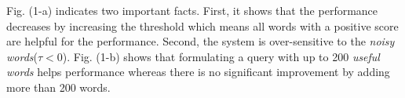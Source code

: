 \documentclass{sig-alternate}
\begin{document}
Fig. (1-a) indicates two important facts. First, it shows that the performance decreases by increasing the threshold which means all words with a positive score are helpful for the performance. Second, the system is over-sensitive to the {\em noisy words}($ \tau<0 $). Fig. (1-b) shows that formulating a query with up to 200 {\em useful words} helps performance whereas there is no significant improvement by adding more than 200 words. 
\end{document}
